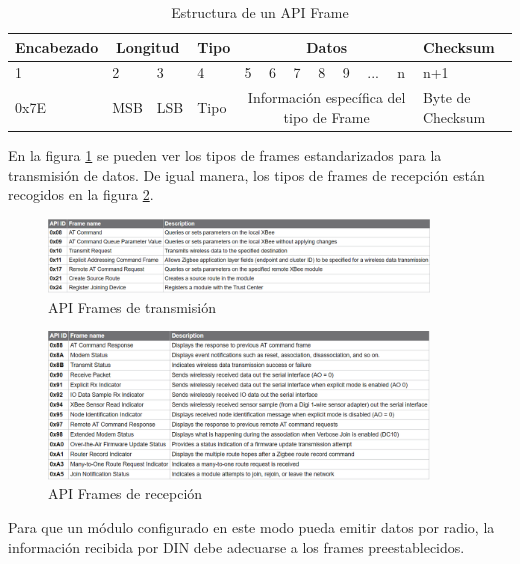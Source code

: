 \begin{itemize}
\begin{table}[bt]
\begin{center}
\begin{tabular}{|m{20mm}|m{10mm}|m{10mm}|m{10mm}|m{5mm}|m{5mm}|m{5mm}|m{5mm}|m{5mm}|m{5mm}|m{5mm}|m{20mm}|}
\hline
\textbf{Encabezado} & \multicolumn{2}{|c|}{\textbf{Longitud}} & \textbf{Tipo} & \multicolumn{7}{|c|}{\textbf{Datos}} & \textbf{Checksum}\\
\hline
\hline
1 & 2 & 3 & 4 & 5 & 6 & 7 & 8 & 9 & ... & n & n+1\\
\hline
0x7E & MSB & LSB & Tipo & \multicolumn{7}{|c|}{Información específica del tipo de Frame} & Byte de Checksum\\
\hline
\end{tabular}
\end{center}
\caption{Estructura de un API Frame}
\label{tab:APIFrame}
\end{table}

En la figura \ref{fig:txAPI} se pueden ver los tipos de frames estandarizados para la transmisión de datos. De igual manera, los tipos de frames de recepción están recogidos en la figura \ref{fig:rxAPI}.

\begin{figure}[b]
\centering
\includegraphics[width=0.9\textwidth]{figuras/txAPIFrames.png}
\caption{API Frames de transmisión}
\label{fig:txAPI}
\end{figure}

\begin{figure}[H]
\centering
\includegraphics[width=0.9\textwidth]{figuras/rxAPIFrames.png}
\caption{API Frames de recepción}
\label{fig:rxAPI}
\end{figure}

Para que un módulo configurado en este modo pueda emitir datos por radio, la información recibida por DIN debe adecuarse a los frames preestablecidos.


\end{itemize}
